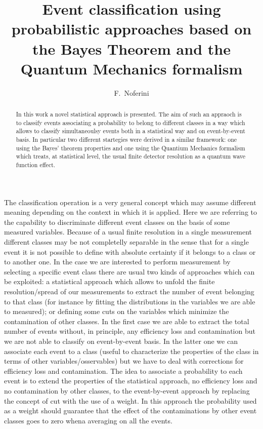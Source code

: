 \documentclass{cimento}
\title{Event classification using probabilistic approaches based on the Bayes Theorem and the Quantum Mechanics formalism}
\author{F.~Noferini\from{ins:centrofermi}\from{ins:infn}}
\begin{document}
\maketitle                            
\begin{abstract}
In this work a novel statistical approach is presented.
The aim of such an appraoch is to classify events associating a probability to belong to different classes in a way
which allows to classify simultaneoulsy events both in a statistical way and on event-by-event basis.
In particular two different startegies were derived in a similar framework: one using the Bayes' theorem properties
and one using the Quantium Mechanics formalism which treats, at statistical level, the usual finite detector resolution as a quantum
wave function effect.
\end{abstract}

\tableofcontents{}


The classification operation is a very general concept which may assume different meaning depending on the context in which
it is applied.
Here we are referring to the capability to discriminate different event classes on the basis of some
measured variables.
Because of a usual finite resolution in a single measurement different classes may be not completelly separable
in the sense that for a single event it is not possible to define with absolute certainty if it belongs to a class
or to another one.
In the case we are interested to perform measurement by selecting a specific event class there are usual two kinds of
approaches which can be exploited: a statistical approach which allows to unfold the finite resolution/spread of our
measurements to extract the number of event belonging to that class (for instance by fitting the distributions in the
variables we are able to measured); or defining some cuts on the variables which minimize the contamination of other classes.
In the first case we are able to extract the total number of events without, in principle, any efficiency loss and
contamination but we are not able to classify on event-by-event basis.
In the latter one we can associate each event to a class (useful to characterize the properties of the class in terms of
other variables/osservables) but we have to deal with corrections for efficiency loss and contamination.
The idea to associate a probability to each event is to extend the properties of the statistical approach, no
efficiency loss and no contamination by other classes, to the event-by-event approach by replacing the concept
of cut with the use of a  weight.
In this approach the probability used as a weight should guarantee that the effect of the contaminations by other
event classes goes to zero whena averaging on all the events.
\end{document}
